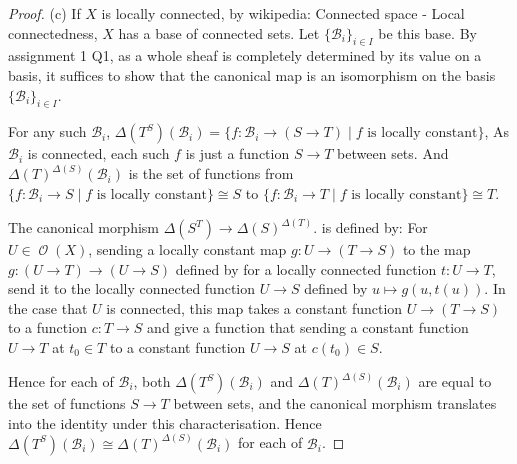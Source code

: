 \documentclass[a4paper]{article}
\DeclareMathOperator{\mcO}{\mathcal {O}}
\begin{document}
\begin{proof}
    (c) If $X$ is locally connected, by wikipedia: Connected space - Local connectedness, $X$ has a base of connected sets. Let $\{\mathcal B_i\}_{i\in I}$ be this base. By assignment 1 Q1, as a whole sheaf is completely determined by its value on a basis, it suffices to show that the canonical map is an isomorphism on the basis $\{\mathcal B_i\}_{i\in I}$.
    
    
    For any such $\mathcal B_i$, $\Delta(T^S)(\mathcal B_i)=\{f:\mathcal B_i\to (S\to T)\mid \text{$f$ is locally constant}\}$, As $\mathcal B_i$ is connected, each such $f$ is just a function $S\to T$ between sets. And $\Delta(T)^{\Delta(S)}(\mathcal B_i)$ is the set of functions from $\{f:\mathcal B_i\to S\mid \text{$f$ is locally constant}\}\cong S$ to $\{f:\mathcal B_i\to T\mid \text{$f$ is locally constant}\}\cong T$.

    The canonical morphism $\Delta(S^T)\to \Delta(S)^{\Delta(T)}$. is defined by: For $U\in\mcO(X)$, sending a locally constant map $g:U\to (T\to S)$ to the map $g:(U\to T)\to (U\to S)$ defined by for a locally connected function $t: U\to T$, send it to the locally connected function $U\to S$ defined by $u\mapsto g(u,t(u))$. In the case that $U$ is connected, this map takes a constant function $U\to (T\to S)$ to a function $c:T\to S$ and give a function that sending a constant function $U\to T$ at $t_0\in T$ to a constant function $U\to S$ at $c(t_0)\in S$. 

    Hence for each of $\mathcal B_i$, both $\Delta(T^S)(\mathcal B_i)$ and $\Delta(T)^{\Delta(S)}(\mathcal B_i)$ are equal to the set of functions $S\to T$ between sets, and the canonical morphism translates into the identity under this characterisation. Hence $\Delta(T^S)(\mathcal B_i)\cong \Delta(T)^{\Delta(S)}(\mathcal B_i)$ for each of $\mathcal B_i$. 

\end{proof}
\end{document}
